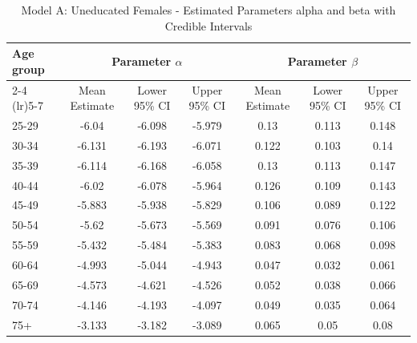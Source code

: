 \begin{landscape}
\begin{table}[htbp]
\centering
\caption{Model A: Uneducated Females - Estimated Parameters alpha and beta with Credible Intervals}
\label{tab:parameters_ab1}
\begin{tabular}{@{}lcccccc@{}}
\toprule
Age group & \multicolumn{3}{c}{Parameter \(\alpha\)} & \multicolumn{3}{c}{Parameter \(\beta\)} \\ 
\cmidrule(lr){2-4} \cmidrule(lr){5-7}
          & Mean Estimate & Lower 95\% CI & Upper 95\% CI & Mean Estimate & Lower 95\% CI & Upper 95\% CI \\ 
\midrule
25-29 & -6.04 & -6.098 & -5.979 & 0.13 & 0.113 & 0.148 \\
30-34 & -6.131 & -6.193 & -6.071 & 0.122 & 0.103 & 0.14 \\
35-39 & -6.114 & -6.168 & -6.058 & 0.13 & 0.113 & 0.147 \\
40-44 & -6.02 & -6.078 & -5.964 & 0.126 & 0.109 & 0.143 \\
45-49 & -5.883 & -5.938 & -5.829 & 0.106 & 0.089 & 0.122 \\
50-54 & -5.62 & -5.673 & -5.569 & 0.091 & 0.076 & 0.106 \\
55-59 & -5.432 & -5.484 & -5.383 & 0.083 & 0.068 & 0.098 \\
60-64 & -4.993 & -5.044 & -4.943 & 0.047 & 0.032 & 0.061 \\
65-69 & -4.573 & -4.621 & -4.526 & 0.052 & 0.038 & 0.066 \\
70-74 & -4.146 & -4.193 & -4.097 & 0.049 & 0.035 & 0.064 \\
75+ & -3.133 & -3.182 & -3.089 & 0.065 & 0.05 & 0.08 \\
\bottomrule
\end{tabular}
\end{table}
\end{landscape}